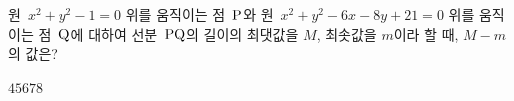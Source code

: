 원~$x^2+y^2-1=0$ 위를 움직이는 점~$\mathrm{P}$와 원~$x^2+y^2-6x-8y+21=0$ 위를 움직이는 점~$\mathrm{Q}$에 대하여 선분~$\mathrm{PQ}$의 길이의 최댓값을 $M$, 최솟값을 $m$이라 할 때, $M-m$의 값은?
\begin{choices32}{$4$}{$5$}{$6$}{$7$}{$8$}\end{choices32}
